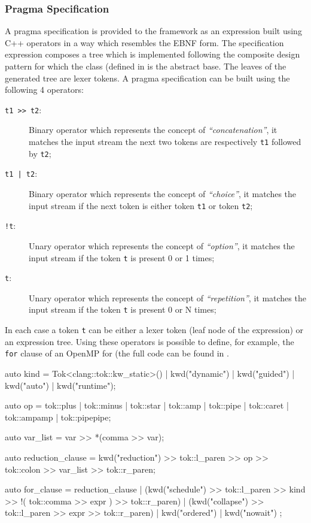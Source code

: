 \subsubsection{Pragma Specification}

A pragma specification is provided to the framework as an expression built using
C++ operators in a way which resembles the EBNF form. The specification
expression composes a tree which is implemented following the composite design
pattern for which the  class (defined in
 is the abstract base. The leaves of the
generated tree are lexer tokens. A pragma specification can be built using the
following 4 operators:

\begin{description}
\item [{\tt t1 >> t2}:] Binary operator which represents the concept of
\emph{``concatenation''}, it matches the input stream the next two tokens are
respectively {\tt t1} followed by {\tt t2};

\item [{\tt t1 | t2}:] Binary operator which represents the concept of
\emph{``choice''}, it matches the input stream if the next token is either token
{\tt t1} or token {\tt t2};

\item [{\tt !t}:] Unary operator which represents the concept of
\emph{``option''}, it matches the input stream if the token {\tt t} is present 0
or 1 times;

\item [{\tt *t}:] Unary operator which represents the concept of
\emph{``repetition''}, it matches the input stream if the token {\tt t} is
present 0 or N times;
\end{description}

In each case a token {\tt t} can be either a lexer token (leaf node of the
expression) or an expression tree. Using these operators is possible to define, for
example, the {\tt for} clause of an OpenMP for (the full code can be found in
.

\begin{srcCode}
auto kind =  
	Tok<clang::tok::kw_static>() | kwd("dynamic") | kwd("guided") | 
	kwd("auto") | kwd("runtime");

auto op = tok::plus | tok::minus | tok::star | tok::amp |
		  tok::pipe | tok::caret | tok::ampamp | tok::pipepipe;

auto var_list = var >> *(comma >> var);

auto reduction_clause = kwd("reduction") >> 
	tok::l_paren >> op >> tok::colon >> var_list >> tok::r_paren;

auto for_clause =	
	    reduction_clause
	|	(kwd("schedule") >> tok::l_paren >> kind >> 
		!( tok::comma >> expr ) >> tok::r_paren)
	|	(kwd("collapse") >> tok::l_paren >> expr >> tok::r_paren)
	|   kwd("ordered") | kwd("nowait") 
	;
\end{srcCode}

